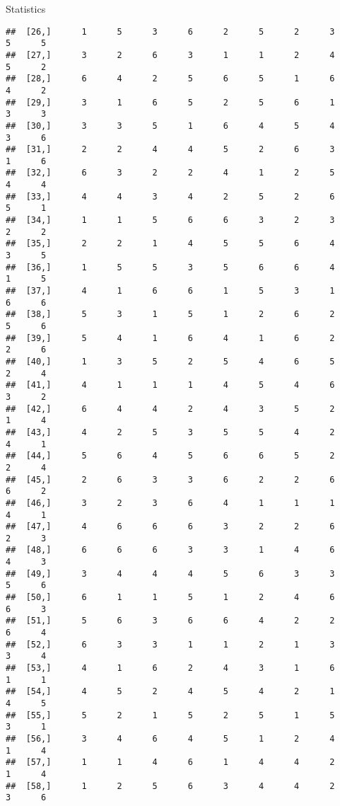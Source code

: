 \documentclass[
  ignorenonframetext,
]{beamer}
\begin{document}
\begin{frame}[fragile]{Statistics}
\begin{verbatim}
##  [26,]      1      5      3      6      2      5      2      3      5      5
##  [27,]      3      2      6      3      1      1      2      4      5      2
##  [28,]      6      4      2      5      6      5      1      6      4      2
##  [29,]      3      1      6      5      2      5      6      1      3      3
##  [30,]      3      3      5      1      6      4      5      4      3      6
##  [31,]      2      2      4      4      5      2      6      3      1      6
##  [32,]      6      3      2      2      4      1      2      5      4      4
##  [33,]      4      4      3      4      2      5      2      6      5      1
##  [34,]      1      1      5      6      6      3      2      3      2      2
##  [35,]      2      2      1      4      5      5      6      4      3      5
##  [36,]      1      5      5      3      5      6      6      4      1      5
##  [37,]      4      1      6      6      1      5      3      1      6      6
##  [38,]      5      3      1      5      1      2      6      2      5      6
##  [39,]      5      4      1      6      4      1      6      2      2      6
##  [40,]      1      3      5      2      5      4      6      5      2      4
##  [41,]      4      1      1      1      4      5      4      6      3      2
##  [42,]      6      4      4      2      4      3      5      2      1      4
##  [43,]      4      2      5      3      5      5      4      2      4      1
##  [44,]      5      6      4      5      6      6      5      2      2      4
##  [45,]      2      6      3      3      6      2      2      6      6      2
##  [46,]      3      2      3      6      4      1      1      1      4      1
##  [47,]      4      6      6      6      3      2      2      6      2      3
##  [48,]      6      6      6      3      3      1      4      6      4      3
##  [49,]      3      4      4      4      5      6      3      3      5      6
##  [50,]      6      1      1      5      1      2      4      6      6      3
##  [51,]      5      6      3      6      6      4      2      2      6      4
##  [52,]      6      3      3      1      1      2      1      3      3      4
##  [53,]      4      1      6      2      4      3      1      6      1      1
##  [54,]      4      5      2      4      5      4      2      1      4      5
##  [55,]      5      2      1      5      2      5      1      5      3      1
##  [56,]      3      4      6      4      5      1      2      4      1      4
##  [57,]      1      1      4      6      1      4      4      2      1      4
##  [58,]      1      2      5      6      3      4      4      2      3      6

\end{verbatim}
\end{frame}
\end{document}
